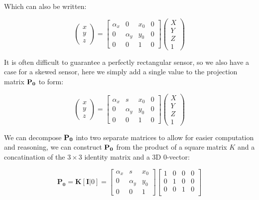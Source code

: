 \documentclass{beamer}
\begin{document}
\begin{frame}[allowframebreaks]
Which can also be written:

\[
  \begin{pmatrix}
    x \\ y \\z
  \end{pmatrix} =
  \begin{bmatrix}
    \alpha_{x} & 0  & x_{0} & 0\\
    0 & \alpha_{y} & y_{0} & 0\\
    0 & 0 & 1 & 0
  \end{bmatrix}
  \begin{pmatrix}
    X \\ Y \\ Z \\1
  \end{pmatrix}
\]

It is often difficult to guarantee a perfectly rectangular sensor, so we also have a case for a skewed sensor, here we simply add a single value to the projection matrix $\bf P_{0}$ to form:


\[
  \begin{pmatrix}
    x \\ y \\z
  \end{pmatrix} =
  \begin{bmatrix}
    \alpha_{x} & s  & x_{0} & 0\\
    0 & \alpha_{y} & y_{0} & 0\\
    0 & 0 & 1 & 0
  \end{bmatrix}
  \begin{pmatrix}
    X \\ Y \\ Z \\1
  \end{pmatrix}
\]


We can decompose $\bf P_{0}$ into two separate matrices to allow for easier computation and reasoning, we can construct $\bf P_{0}$ from the product of a square matrix $K$ and a concatination of the $3\times 3$ identity matrix and a 3D 0-vector:

\[
  \mathbf{P_{0}} = \mathbf{K}[\textbf{I}|0] = \begin{bmatrix}
    \alpha_{x} & s  & x_{0} \\
    0 & \alpha_{y} & y_{0} \\
    0 & 0 & 1
  \end{bmatrix}
  \begin{bmatrix}
    1 & 0 & 0 & 0 \\
    0 & 1 & 0 & 0 \\
    0 & 0 & 1 & 0 \\
  \end{bmatrix}
\]


\end{frame}
\end{document}
